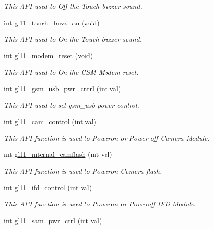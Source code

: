 \begin{DoxyCompactItemize}
\begin{DoxyCompactList}\small\item\em This A\+P\+I used to Off the Touch buzzer sound. \end{DoxyCompactList}\item 
int \hyperlink{group__A_ga8d79d9249ef0ad95f6abdc7517d8d7e9}{gl11\+\_\+touch\+\_\+buzz\+\_\+on} (void)
\begin{DoxyCompactList}\small\item\em This A\+P\+I used to On the Touch buzzer sound. \end{DoxyCompactList}\item 
int \hyperlink{group__A_ga48e50ce94407b9485b8c4559970f8540}{gl11\+\_\+modem\+\_\+reset} (void)
\begin{DoxyCompactList}\small\item\em This A\+P\+I used to On the G\+S\+M Modem reset. \end{DoxyCompactList}\item 
int \hyperlink{group__A_ga6a13d4be38437dd96e5f7d3f787e3564}{gl11\+\_\+gsm\+\_\+usb\+\_\+pwr\+\_\+cntrl} (int val)
\begin{DoxyCompactList}\small\item\em This A\+P\+I used to set gsm\+\_\+usb power control. \end{DoxyCompactList}\item 
int \hyperlink{group__A_gac92bbb5843bb279006fb1323fe26bbe6}{gl11\+\_\+cam\+\_\+control} (int val)
\begin{DoxyCompactList}\small\item\em This A\+P\+I function is used to Poweron or Power off Camera Module. \end{DoxyCompactList}\item 
int \hyperlink{group__A_gae275e6f5f74ef7cad0ef2cab0abb7a98}{gl11\+\_\+internal\+\_\+camflash} (int val)
\begin{DoxyCompactList}\small\item\em This A\+P\+I function is used to Poweron Camera flash. \end{DoxyCompactList}\item 
int \hyperlink{group__A_gaa9b46ebf6af760a60988b8d87b437687}{gl11\+\_\+ifd\+\_\+control} (int val)
\begin{DoxyCompactList}\small\item\em This A\+P\+I function is used to Poweron or Poweroff I\+F\+D Module. \end{DoxyCompactList}\item 
int \hyperlink{group__A_ga91a7ae1d76d33512d8d4b80e81109616}{gl11\+\_\+sam\+\_\+pwr\+\_\+ctrl} (int val)

\end{DoxyCompactItemize}
